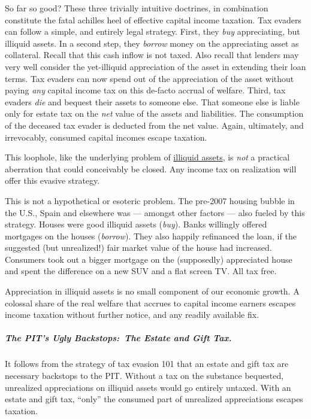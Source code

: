 So far so good?
These three trivially intuitive doctrines, in combination constitute the fatal achilles heel of effective capital income taxation.
Tax evaders can follow a simple, and entirely legal strategy.
First, they \emph{buy} appreciating, but illiquid assets.
In a second step, they \emph{borrow} money on the appreciating asset as collateral.
Recall that this cash inflow is not taxed.
Also recall that lenders may very well consider the yet-illiquid appreciation of the asset in extending their loan terms.
Tax evaders can now spend out of the appreciation of the asset without paying \emph{any} capital income tax on this de-facto accrual of welfare.
Third, tax evaders \emph{die} and bequest their assets to someone else.
That someone else is liable only for estate tax on the \emph{net} value of the assets and liabilities.
The consumption of the deceased tax evader is deducted from the net value.
Again, ultimately, and irrevocably, consumed capital incomes escape taxation.

This loophole, like the underlying problem of \hyperref[sec:flight-2-illiquid]{illiquid assets}, is \emph{not} a practical aberration that could conceivably be closed.
Any income tax on realization will offer this evasive strategy.

This is not a hypothetical or esoteric problem.
The pre-2007 housing bubble in the U.S., Spain and elsewhere was --- amongst other factors --- also fueled by this strategy.
Houses were good illiquid assets (\emph{buy}).
Banks willingly offered mortgages on the houses (\emph{borrow}).
They also happily refinanced the loan, if the suggested (but unrealized!) fair market value of the house had increased.
Consumers took out a bigger mortgage on the (supposedly) appreciated house and spent the difference on a new SUV and a flat screen TV.
All tax free.

Appreciation in illiquid assets is no small component of our economic growth.
A colossal share of the real welfare that accrues to capital income earners escapes income taxation without further notice, and any readily available fix.

\subparagraph{The PIT's Ugly Backstops:~The Estate and Gift Tax.}
It follows from the strategy of tax evasion 101 that an estate and gift tax are necessary backstops to the PIT.
Without a tax on the substance bequested, unrealized appreciations on illiquid assets would go entirely untaxed.
With an estate and gift tax, ``only'' the consumed part of unrealized appreciations escapes taxation.

